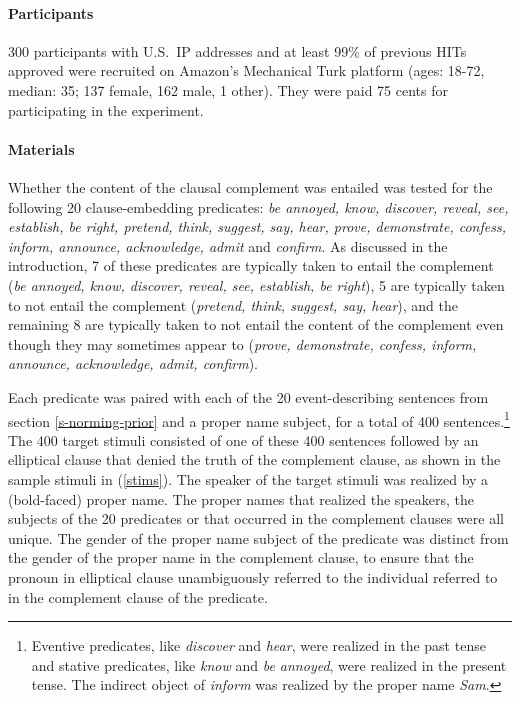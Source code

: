 \documentclass[11pt,fleqn]{article}
\newcommand{\6}{\mbox{$[\hspace*{-.6mm}[$}}
\newcommand{\9}{\mbox{$]\hspace*{-.6mm}]$}}
\begin{document}
\paragraph{Participants} 300 participants with U.S.\ IP addresses and at least 99\% of previous HITs approved were recruited on Amazon's Mechanical Turk platform (ages: 18-72, median: 35; 137 female, 162 male, 1 other). They were paid 75 cents for participating in the experiment.

\paragraph{Materials} Whether the content of the clausal complement was entailed was tested for the following 20 clause-embedding predicates: {\em be annoyed, know, discover, reveal, see, establish, be right, pretend, think, suggest, say, hear, prove, demonstrate, confess, inform, announce, acknowledge, admit} and {\em confirm}. As discussed in the introduction, 7 of these predicates are typically taken to entail the complement ({\em be annoyed, know, discover, reveal, see, establish, be right}), 5 are typically taken to not entail the complement ({\em pretend, think, suggest, say, hear}), and the remaining 8 are typically taken to not entail the content of the complement even though they may sometimes appear to ({\em prove, demonstrate, confess, inform, announce, acknowledge, admit, confirm}).

Each predicate was paired with each of the 20 event-describing sentences from section \ref{s-norming-prior} and a proper name subject, for a total of 400 sentences.\footnote{Eventive predicates, like {\em discover} and {\em hear}, were realized in the past tense and stative predicates, like {\em know} and {\em be annoyed}, were realized in the present tense. The indirect object of {\em inform} was realized by the proper name {\em Sam}.} The 400 target stimuli consisted of one of these 400 sentences followed by an elliptical clause that denied the truth of the complement clause, as shown in the sample stimuli in (\ref{stims}). The speaker of the target stimuli was realized by a (bold-faced) proper name. The proper names that realized the speakers, the subjects of the 20 predicates or that occurred in the complement clauses were all unique. The gender of the proper name subject of the predicate was distinct from the gender of the proper name in the complement clause, to ensure that the pronoun in elliptical clause unambiguously referred to the individual referred to in the complement clause of the predicate.
\end{document}
